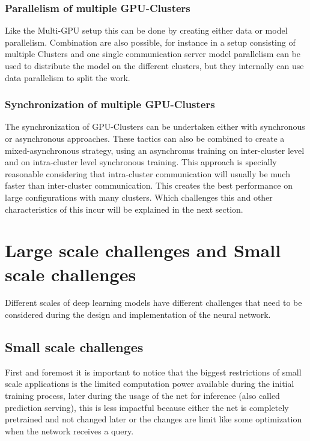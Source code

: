 \documentclass[conference]{IEEEtran}
\begin{document}
\subsubsection{Parallelism of multiple GPU-Clusters}
Like the Multi-GPU setup this can be done by creating either data or model parallelism. Combination are also possible, for instance in a setup consisting of multiple Clusters and one single communication server model parallelism can be used to distribute the model on the different clusters, but they internally can use data parallelism to split the work\cite{wang2016deep}.

\subsubsection{Synchronization of multiple GPU-Clusters}
The synchronization of GPU-Clusters can be undertaken either with synchronous or asynchronous approaches. These tactics can also be combined to create a mixed-asynchronous strategy, using an asynchronus training on inter-cluster level and on intra-cluster level synchronous training\cite{sastre2017scalability}. This approach is specially reasonable considering that intra-cluster communication will usually be much faster than inter-cluster communication. This creates the best performance on large configurations with many clusters\cite{wang2016deep}. Which challenges this and other characteristics of this incur will be explained in the next section.



\section{Large scale challenges and Small scale challenges}
Different scales of deep learning models have different challenges that need to be considered during the design and implementation of the neural network.

\subsection{Small scale challenges}
First and foremost it is important to notice that the biggest restrictions of small scale applications is the limited computation power available during the initial training process, later during the usage of the net for inference (also called prediction serving), this is less impactful because either the net is completely pretrained and not changed later or the changes are limit like some optimization when the network receives a query.
\end{document}
